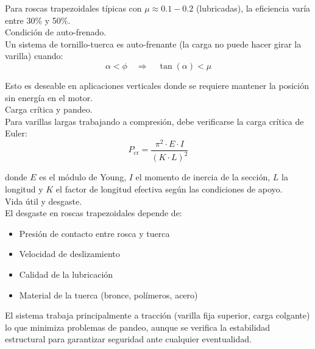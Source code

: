 Para roscas trapezoidales típicas con $\mu \approx 0.1-0.2$ (lubricadas), la eficiencia varía entre 30\% y 50\%.\\

Condición de auto-frenado.\\
Un sistema de tornillo-tuerca es auto-frenante (la carga no puede hacer girar la varilla) cuando:
\begin{equation}
    \alpha < \phi \quad \Rightarrow \quad \tan(\alpha) < \mu
\end{equation}

Esto es deseable en aplicaciones verticales donde se requiere mantener la posición sin energía en el motor.\\

Carga crítica y pandeo. \\
Para varillas largas trabajando a compresión, debe verificarse la carga crítica de Euler:
\begin{equation}
    P_{\text{cr}} = \frac{\pi^2 \cdot E \cdot I}{(K \cdot L)^2}
\end{equation}

donde $E$ es el módulo de Young, $I$ el momento de inercia de la sección, $L$ la longitud y $K$ el factor de longitud efectiva según las condiciones de apoyo.\\

Vida útil y desgaste.\\
\noindent
El desgaste en roscas trapezoidales depende de:
\begin{itemize}[label=$\bullet$]
    \item Presión de contacto entre rosca y tuerca
    \item Velocidad de deslizamiento
    \item Calidad de la lubricación
    \item Material de la tuerca (bronce, polímeros, acero)
\end{itemize}

El sistema trabaja principalmente a tracción (varilla fija superior, carga colgante) lo que minimiza problemas de pandeo, aunque se verifica la estabilidad estructural para garantizar seguridad ante cualquier eventualidad.

